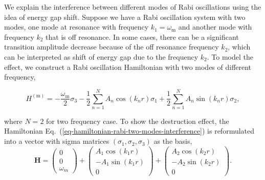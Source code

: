 \documentclass[%
reprint,
 amsmath,amssymb,
 prd,
]{revtex4-1}
\begin{document}
We explain the interference between different modes of Rabi oscillations using the idea of energy gap shift. Suppose we have a Rabi oscillation system with two modes, one mode at resonance with frequency $k_1=\omega_{\mathrm m}$ and another mode with frequency $k_2$ that is off resonance. In some cases, there can be a significant transition amplitude decrease because of the off resonance frequency $k_2$, which can be interpreted as shift of energy gap due to the frequency $k_2$. To model the effect, we construct a Rabi oscillation Hamiltonian with two modes of different frequency,
\begin{widetext}
\begin{equation}
H^{(\mathrm{m})}  = -\frac{\omega_{\mathrm{m}}}{2} \sigma_3 - \frac{1}{2} \sum_{n=1}^N  A_n \cos (k_n r) \sigma_1 + \frac{1}{2} \sum_{n=1}^N  A_n \sin (k_n r) \sigma_2,
\label{eq-hamiltonian-rabi-two-modes-interference}
\end{equation}
\end{widetext}
where $N=2$ for two frequency case. To show the destruction effect, the Hamiltonian Eq.~(\ref{eq-hamiltonian-rabi-two-modes-interference}) is reformulated into a vector with sigma matrices $(\sigma_1,\sigma_2,\sigma_3)$ as the basis,
\begin{equation}
\mathbf H = \begin{pmatrix}
0\\
0\\
\omega_m
\end{pmatrix} + \begin{pmatrix}
A_1 \cos (k_1 r)\\
-A_1 \sin (k_1 r)\\
0
\end{pmatrix} + \begin{pmatrix}
A_2 \cos (k_2 r)\\
-A_2 \sin (k_2 r)\\
0
\end{pmatrix}.
\end{equation}
\end{document}
